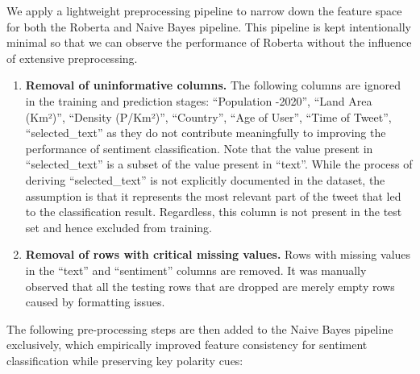 \documentclass[11pt]{article}
\begin{document}
We apply a lightweight preprocessing pipeline to narrow down the feature space for both the Roberta and Naive Bayes pipeline. This pipeline is kept intentionally minimal so that we can observe the performance of Roberta without the influence of extensive preprocessing.

\begin{enumerate}
    \item \textbf{Removal of uninformative columns.} The following columns are ignored in the training and prediction stages: ``Population -2020'', ``Land Area (Km²)'', ``Density (P/Km²)'', ``Country'', ``Age of User'', ``Time of Tweet'', ``selected\_text'' as they do not contribute meaningfully to improving the performance of sentiment classification. Note that the value present in ``selected\_text'' is a subset of the value present in ``text''. While the process of deriving ``selected\_text'' is not explicitly documented in the dataset, the assumption is that it represents the most relevant part of the tweet that led to the classification result. Regardless, this column is not present in the test set and hence excluded from training.
    \item \textbf{Removal of rows with critical missing values.} Rows with missing values in the ``text'' and ``sentiment'' columns are removed. It was manually observed that all the testing rows that are dropped are merely empty rows caused by formatting issues.
\end{enumerate}

The following pre-processing steps are then added to the Naive Bayes pipeline exclusively, which empirically improved feature consistency for sentiment classification while preserving key polarity cues:
\end{document}
